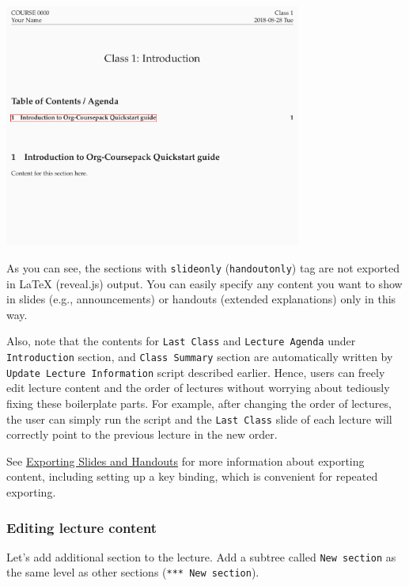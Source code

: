 \documentclass[10pt,article]{article}
\begin{document}
\begin{center}
\includegraphics[height=8cm]{../../../Assets/Images/Org-Teaching/Quickstart_Lecture-Exported_LaTeX.png}
\end{center}

As you can see, the sections with \texttt{slideonly} (\texttt{handoutonly}) tag are not
exported in \LaTeX{} (reveal.js) output. You can easily specify any content you
want to show in slides (e.g., announcements) or handouts (extended explanations)
only in this way.

Also, note that the contents for \texttt{Last Class} and \texttt{Lecture Agenda} under
\texttt{Introduction} section, and \texttt{Class Summary} section are automatically written
by \texttt{Update Lecture Information} script described earlier. Hence, users can
freely edit lecture content and the order of lectures without worrying about
tediously fixing these boilerplate parts. For example, after changing the
order of lectures, the user can simply run the script and the \texttt{Last Class}
slide of each lecture will correctly point to the previous lecture in the new
order.

See \href{https://joonro.github.io/Org-Coursepack/Lectures/05\%2520Exporting\%2520Slides\%2520and\%2520Handouts.html}{Exporting Slides and Handouts} for more information about exporting
content, including setting up a key binding, which is convenient for repeated
exporting.
\subsubsection{Editing lecture content}
\label{sec:orgf7a36ca}
Let's add additional section to the lecture. Add a subtree called \texttt{New section} as the same
level as other sections (\texttt{*** New section}). 
\end{document}
